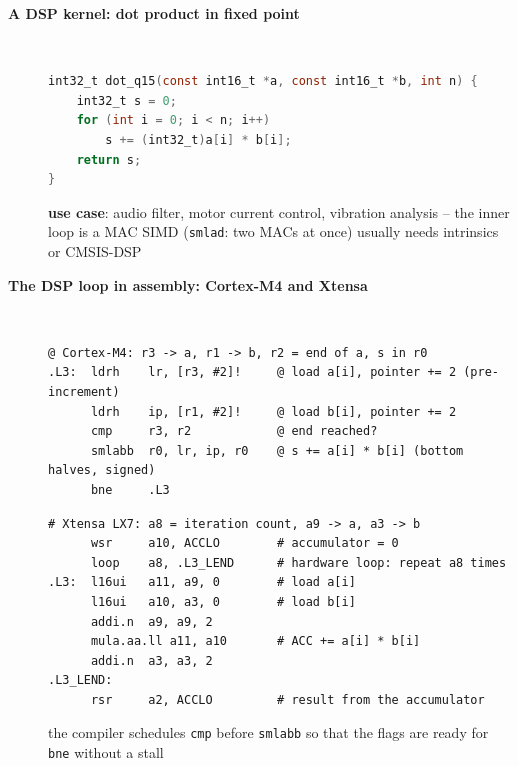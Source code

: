 \begin{description}
\item[{\rot\bf A DSP kernel: dot product in fixed point}]~\\[-\lstskip]
\begin{lstlisting}[language=C]
int32_t dot_q15(const int16_t *a, const int16_t *b, int n) {
    int32_t s = 0;
    for (int i = 0; i < n; i++)
        s += (int32_t)a[i] * b[i];
    return s;
}
\end{lstlisting}
\begin{center}
\end{center}
\bi
	\ite \textbf{use case}: audio filter, motor current control, vibration analysis -- the inner loop is a MAC
	\ite SIMD (\texttt{smlad}: two MACs at once) usually needs intrinsics or CMSIS-DSP
\ei
\os{\newpage}

\item[{\rot\bf The DSP loop in assembly: Cortex-M4 and Xtensa}]~\\[-\lstskip]
\begin{lstlisting}[language={}]
@ Cortex-M4: r3 -> a, r1 -> b, r2 = end of a, s in r0
.L3:  ldrh    lr, [r3, #2]!     @ load a[i], pointer += 2 (pre-increment)
      ldrh    ip, [r1, #2]!     @ load b[i], pointer += 2
      cmp     r3, r2            @ end reached?
      smlabb  r0, lr, ip, r0    @ s += a[i] * b[i] (bottom halves, signed)
      bne     .L3
\end{lstlisting}
\begin{lstlisting}[language={}]
# Xtensa LX7: a8 = iteration count, a9 -> a, a3 -> b
      wsr     a10, ACCLO        # accumulator = 0
      loop    a8, .L3_LEND      # hardware loop: repeat a8 times
.L3:  l16ui   a11, a9, 0        # load a[i]
      l16ui   a10, a3, 0        # load b[i]
      addi.n  a9, a9, 2
      mula.aa.ll a11, a10       # ACC += a[i] * b[i]
      addi.n  a3, a3, 2
.L3_LEND:
      rsr     a2, ACCLO         # result from the accumulator
\end{lstlisting}
\bi
	\ite the compiler schedules \texttt{cmp} before \texttt{smlabb} so that the flags are ready for \texttt{bne} without a stall
\ei
\os{\newpage}


\end{description}
